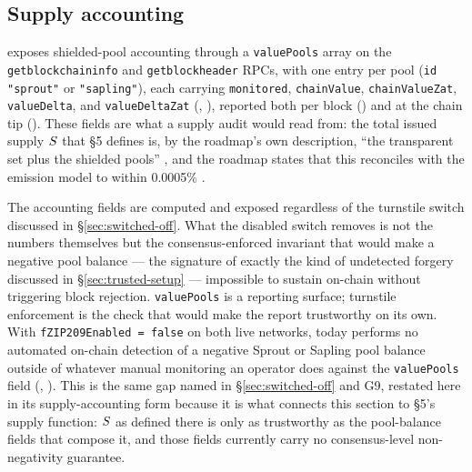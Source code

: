 \subsection{Supply accounting}
\label{sec:supply-accounting}

\fluxd exposes shielded-pool accounting through a \texttt{valuePools} array on the
\texttt{getblockchaininfo} and \texttt{getblockheader} RPCs, with one entry per pool (\texttt{id}
\texttt{"sprout"} or \texttt{"sapling"}), each carrying \texttt{monitored}, \texttt{chainValue},
\texttt{chainValueZat}, \texttt{valueDelta}, and \texttt{valueDeltaZat} (\shipped,
), reported both per block
() and at the chain tip
(). These fields are what a supply audit would read
from: the total issued supply $S$ that \S5 defines is, by the roadmap's own description, ``the
transparent set plus the shielded pools'' , and the roadmap
states that this reconciles with the emission model to within 0.0005\%
.

The accounting fields are computed and exposed regardless of the turnstile switch discussed in
\S\ref{sec:switched-off}. What the disabled switch removes is not the numbers themselves but the
consensus-enforced invariant that would make a negative pool balance — the signature of exactly the
kind of undetected forgery discussed in \S\ref{sec:trusted-setup} — impossible to sustain on-chain
without triggering block rejection. \texttt{valuePools} is a reporting surface; turnstile enforcement
is the check that would make the report trustworthy on its own. With \texttt{f\allowbreak{}ZIP209Enabled = false}
on both live networks, \fluxd today performs no automated on-chain detection of a negative Sprout or
Sapling pool balance outside of whatever manual monitoring an operator does against the
\texttt{valuePools} field (\shipped, ). This is the same gap
named in \S\ref{sec:switched-off} and G9, restated here in its supply-accounting form because it is
what connects this section to \S5's supply function: $S$ as defined there is only as trustworthy
as the pool-balance fields that compose it, and those fields currently carry no consensus-level
non-negativity guarantee.

